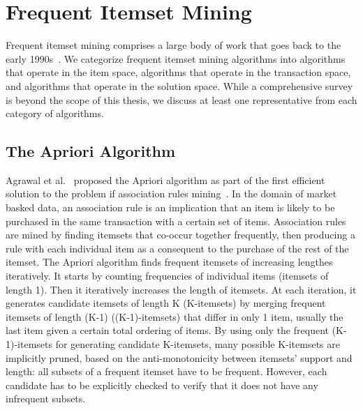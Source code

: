 \documentclass[letterpaper,12pt,titlepage,oneside,final]{book}
\begin{document}
\section{Frequent Itemset Mining}
Frequent itemset mining comprises a large body of work that goes back to the
early 1990s~\cite{agrawal1993mining}. 
We categorize frequent itemset mining algorithms into 
algorithms that operate in the item space, 
algorithms that operate in the transaction space, 
and algorithms that operate in the solution space. 
While a comprehensive survey is beyond the scope of this thesis, 
we discuss at least one representative from each category of algorithms.

\subsection{The Apriori Algorithm}
Agrawal et al.~\cite{agrawal1994fast} proposed the Apriori algorithm 
as part of the first efficient solution to the problem if association rules mining~\cite{agrawal1993mining}.
In the domain of market basked data, 
an association rule is an implication that an item is likely to be purchased
in the same transaction with a certain set of items.
Association rules are mined by finding itemsets that co-occur together frequently, 
then producing a rule with each individual item as a consequent to the purchase of the rest of the itemset.
The Apriori algorithm finds frequent itemsets of increasing lengthes iteratively.
It starts by counting frequencies of individual items (itemsets of length 1). 
Then it iteratively increases the length of itemsets.
At each iteration, it generates candidate itemsets of length K (K-itemsets) 
by merging frequent itemsets of length (K-1) ((K-1)-itemsets) 
that differ in only 1 item, 
usually the last item given a certain total ordering of items.
By using only the frequent  (K-1)-itemsets for generating candidate K-itemsets,
many possible K-itemsets are implicitly pruned, 
based on the anti-monotonicity between itemsets' support and length:
all subsets of a frequent itemset have to be frequent. 
However, each candidate has to be explicitly checked to verify that it does not
have any infrequent subsets.
\end{document}
